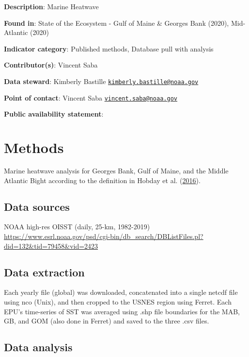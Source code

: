 \documentclass[
]{book}
\begin{document}
\textbf{Description}: Marine Heatwave

\textbf{Found in}: State of the Ecosystem - Gulf of Maine \& Georges Bank (2020), Mid-Atlantic (2020)

\textbf{Indicator category}: Published methods, Database pull with analysis

\textbf{Contributor(s)}: Vincent Saba

\textbf{Data steward}: Kimberly Bastille \href{mailto:kimberly.bastille@noaa.gov}{\nolinkurl{kimberly.bastille@noaa.gov}}

\textbf{Point of contact}: Vincent Saba \href{mailto:vincent.saba@noaa.gov}{\nolinkurl{vincent.saba@noaa.gov}}

\textbf{Public availability statement}:

\hypertarget{methods-24}{%
\section{Methods}\label{methods-24}}

Marine heatwave analysis for Georges Bank, Gulf of Maine, and the Middle Atlantic Bight according to the definition in Hobday et al. (\protect\hyperlink{ref-hobday2016}{2016}).

\hypertarget{data-sources-24}{%
\subsection{Data sources}\label{data-sources-24}}

NOAA high-res OISST (daily, 25-km, 1982-2019) \url{https://www.esrl.noaa.gov/psd/cgi-bin/db_search/DBListFiles.pl?did=132\&tid=79458\&vid=2423}

\hypertarget{data-extraction-22}{%
\subsection{Data extraction}\label{data-extraction-22}}

Each yearly file (global) was downloaded, concatenated into a single netcdf file using nco (Unix), and then cropped to the USNES region using Ferret. Each EPU's time-series of SST was averaged using .shp file boundaries for the MAB, GB, and GOM (also done in Ferret) and saved to the three .csv files.

\hypertarget{data-analysis-22}{%
\subsection{Data analysis}\label{data-analysis-22}}
\end{document}
